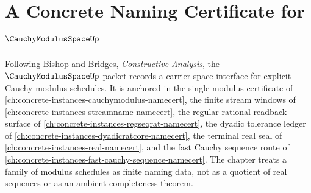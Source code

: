 \chapter{A Concrete Naming Certificate for $\CauchyModulusSpaceUp$}
\label{ch:concrete-instances-cauchy-modulus-space-namecert}

Following Bishop and Bridges, \emph{Constructive Analysis}, the
$\CauchyModulusSpaceUp$ packet records a carrier-space interface for explicit
Cauchy modulus schedules. It is anchored in the single-modulus certificate of
\autoref{ch:concrete-instances-cauchymodulus-namecert}, the finite stream
windows of \autoref{ch:concrete-instances-streamname-namecert}, the regular
rational readback surface of \autoref{ch:concrete-instances-regseqrat-namecert},
the dyadic tolerance ledger of
\autoref{ch:concrete-instances-dyadicratcore-namecert}, the terminal real seal
of \autoref{ch:concrete-instances-real-namecert}, and the fast Cauchy sequence
route of \autoref{ch:concrete-instances-fast-cauchy-sequence-namecert}. The
chapter treats a family of modulus schedules as finite naming data, not as a
quotient of real sequences or as an ambient completeness theorem.

